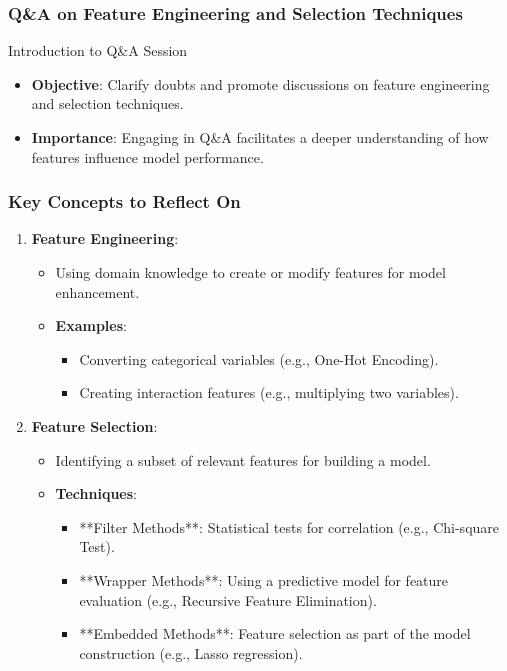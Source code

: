 \documentclass[aspectratio=169]{beamer}
\begin{document}
\begin{frame}
    \frametitle{Q\&A on Feature Engineering and Selection Techniques}
    \begin{block}{Introduction to Q\&A Session}
        \begin{itemize}
            \item \textbf{Objective}: Clarify doubts and promote discussions on feature engineering and selection techniques.
            \item \textbf{Importance}: Engaging in Q\&A facilitates a deeper understanding of how features influence model performance.
        \end{itemize}
    \end{block}
\end{frame}

\begin{frame}
    \frametitle{Key Concepts to Reflect On}
    \begin{enumerate}
        \item \textbf{Feature Engineering}:
            \begin{itemize}
                \item Using domain knowledge to create or modify features for model enhancement.
                \item \textbf{Examples}:
                    \begin{itemize}
                        \item Converting categorical variables (e.g., One-Hot Encoding).
                        \item Creating interaction features (e.g., multiplying two variables).
                    \end{itemize}
            \end{itemize}
        \item \textbf{Feature Selection}:
            \begin{itemize}
                \item Identifying a subset of relevant features for building a model.
                \item \textbf{Techniques}:
                    \begin{itemize}
                        \item **Filter Methods**: Statistical tests for correlation (e.g., Chi-square Test).
                        \item **Wrapper Methods**: Using a predictive model for feature evaluation (e.g., Recursive Feature Elimination).
                        \item **Embedded Methods**: Feature selection as part of the model construction (e.g., Lasso regression).
                    \end{itemize}
            \end{itemize}
    \end{enumerate}
\end{frame}
\end{document}
